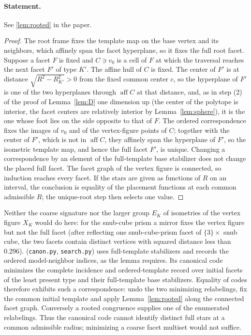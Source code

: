\documentclass[11pt]{article}
\theoremstyle{definition}
\theoremstyle{remark}
\newcommand{\aff}{\operatorname{aff}}
\newcommand{\file}[1]{\path{#1}}
\begin{document}
\paragraph{Statement.} See \ref{lem:rooted} in the paper.

\begin{proof}
The root frame fixes the template map on the base vertex and its
neighbors, which affinely span the facet hyperplane, so it fixes the full
root facet. Suppose a facet $F$ is fixed and $C\ni v_0$ is a cell of $F$
at which the traversal reaches the next facet $F'$ of type $K'$. The affine
hull of $C$ is fixed. The center of $F'$ is at distance
$\sqrt{R^2-R_{K'}^2}>0$ from the fixed common center $c$, so the hyperplane
of $F'$ is one of the two hyperplanes through $\aff C$ at that distance,
and, as in step (2) of the proof of Lemma~\ref{lem:D} one dimension up
(the center of the polytope is interior, the facet centers are relatively
interior by Lemma~\ref{lem:sphere}), it is the one whose foot lies on the
side opposite to that of $F$. The ordered correspondence fixes the images
of $v_0$ and of the vertex-figure points of $C$; together with the center
of $F'$, which is not in $\aff C$, they affinely span the hyperplane of
$F'$, so the isometric template map, and hence the full facet $F'$, is
unique. Changing a correspondence by an element of the full-template base
stabilizer does not change the placed full facet. The facet graph of the
vertex figure is connected, so induction reaches every facet. If the
stars are given as functions of $R$ on an interval, the conclusion is
equality of the placement functions at each common admissible $R$; the
unique-root step then selects one value.
\end{proof}

Neither the coarse signature nor the larger group $E_K$ of isometries of
the vertex figure $X_K$ would do here: for the snub-cube prism a mirror
fixes the vertex figure but not the full facet (after
reflecting one snub-cube-prism facet of $\{3\}\times$ snub cube, the two
facets contain distinct vertices with squared distance less than $0.296$).
\file{checks/primary/check_u3} (\texttt{canon.py}, \texttt{search.py}) uses full-template
stabilizers and records the ordered model-neighbor indices, as the lemma
requires.
Its canonical code minimizes the complete incidence and ordered-template
record over initial facets of the least present type and their full-template
base stabilizers.
Equality of codes therefore exhibits such a correspondence: undo the two
minimizing relabelings, fix the common initial template and apply
Lemma~\ref{lem:rooted} along the connected facet graph. Conversely a rooted
congruence supplies one of the enumerated relabelings. Thus the canonical
code cannot identify distinct full stars at a common admissible radius;
minimizing a coarse facet multiset would not suffice.
\end{document}
